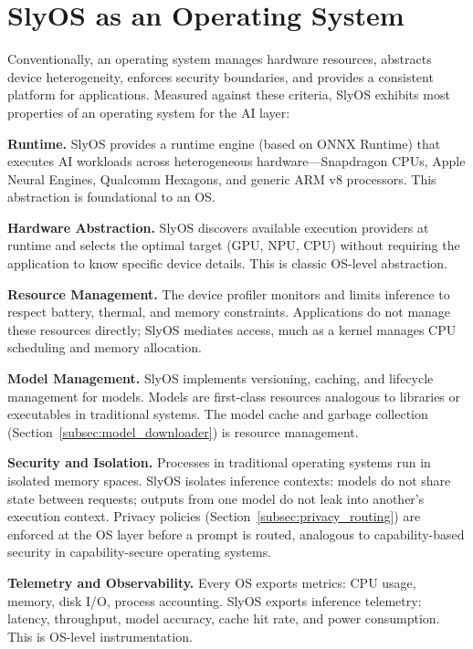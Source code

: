 \documentclass[12pt, letterpaper, twoside]{report}
\begin{document}
\section{SlyOS as an Operating System}
\label{sec:slyos_as_os}

Conventionally, an operating system manages hardware resources, abstracts device heterogeneity, enforces security boundaries, and provides a consistent platform for applications. Measured against these criteria, SlyOS exhibits most properties of an operating system for the AI layer:

\textbf{Runtime.} SlyOS provides a runtime engine (based on ONNX Runtime) that executes AI workloads across heterogeneous hardware---Snapdragon CPUs, Apple Neural Engines, Qualcomm Hexagons, and generic ARM v8 processors. This abstraction is foundational to an OS.

\textbf{Hardware Abstraction.} SlyOS discovers available execution providers at runtime and selects the optimal target (GPU, NPU, CPU) without requiring the application to know specific device details. This is classic OS-level abstraction.

\textbf{Resource Management.} The device profiler monitors and limits inference to respect battery, thermal, and memory constraints. Applications do not manage these resources directly; SlyOS mediates access, much as a kernel manages CPU scheduling and memory allocation.

\textbf{Model Management.} SlyOS implements versioning, caching, and lifecycle management for models. Models are first-class resources analogous to libraries or executables in traditional systems. The model cache and garbage collection (Section~\ref{subsec:model_downloader}) is resource management.

\textbf{Security and Isolation.} Processes in traditional operating systems run in isolated memory spaces. SlyOS isolates inference contexts: models do not share state between requests; outputs from one model do not leak into another's execution context. Privacy policies (Section~\ref{subsec:privacy_routing}) are enforced at the OS layer before a prompt is routed, analogous to capability-based security in capability-secure operating systems.

\textbf{Telemetry and Observability.} Every OS exports metrics: CPU usage, memory, disk I/O, process accounting. SlyOS exports inference telemetry: latency, throughput, model accuracy, cache hit rate, and power consumption. This is OS-level instrumentation.
\end{document}
